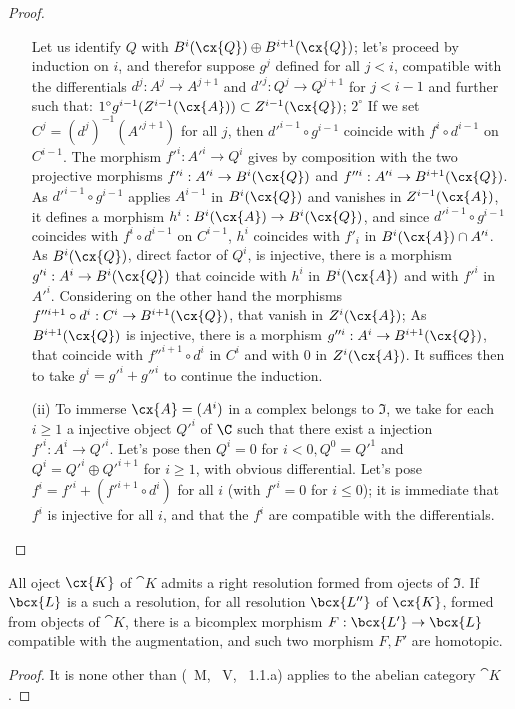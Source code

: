 \begin{proof}
\begin{enumerate}
  Let us identify $Q$ with $B^i(\cx{Q})\oplus B^{i+1}(\cx{Q})$; let's proceed by induction on $i$, and therefor suppose 
  $g^j$ defined for all $j<i$, compatible with the differentials $d^j: A^j\rightarrow A^{j+1}$ and $d'^j: Q^j\rightarrow Q^{j+1}$ for $j<i-1$
  and further such that: $1^\circ g^{i-1}(Z^{i-1}(\cx{A}))\subset Z^{i-1}(\cx{Q})$; 
  $2^\circ$ If we set $C^j = (d^j)^{-1}(A'^{j+1})$ for all $j$, then $d'^{i-1}\circ g^{i-1}$ coincide with $f^i\circ d^{i-1}$ on $C^{i-1}$.
  The morphism $f'^i: A'^i\rightarrow Q^i$ gives by composition with the two projective morphisms $f'^i: A'^i\rightarrow B^i(\cx{Q})$ and $f''^i: A'^i\rightarrow B^{i+1}(\cx{Q})$.
  As $d'^{i-1}\circ g^{i-1}$ applies $A^{i-1}$ in $B^i(\cx{Q})$ and vanishes in $Z^{i-1}(\cx{A})$, it defines a morphism $h^i:B^i(\cx{A})\rightarrow B^i(\cx{Q})$,
  and since $d'^{i-1}\circ g^{i-1}$ coincides with $f^i\circ d^{i-1}$ on $C^{i-1}$, $h^i$ coincides with $f'_i$ in $B^i(\cx{A})\cap A'^i$.
  As $B^i(\cx{Q})$, direct factor of $Q^i$, is injective, there is a morphism $g'^i: A^i\rightarrow B^i(\cx{Q})$ that coincide with $h^i$ in $B^i(\cx{A})$ and with $f'^i$ in $A'^i$.
  Considering on the other hand the morphisms $f''^{i+1}\circ d^i: C^i\rightarrow B^{i+1}(\cx{Q})$, that vanish in $Z^i(\cx{A})$;
  As $B^{i+1}(\cx{Q})$ is injective, there is a morphism $g''^i: A^i\rightarrow B^{i+1}(\cx{Q})$, that coincide with $f''^{i+1}\circ d^i$ in $C^i$ and with 0 in $Z^i(\cx{A})$.
  It suffices then to take $g^i = g'^i + g''^i$ to continue the induction.
  \item[(ii)] To immerse $\cx{A} = (A^i)$ in a complex belongs to $\mathfrak{I}$, we take for each $i\geq 1$ a injective object $Q'^i$ of $\C$ such that there exist a injection $f'^i:A^i\rightarrow Q'^i$.
  Let's pose then $Q^i=0$ for $i<0, Q^0 = Q'^1$ and $Q^i=Q'^i\oplus Q'^{i+1}$ for $i\geq 1$, with obvious differential.
  Let's pose $f^i = f'^i + (f'^{i+1} \circ d^i)$ for all $i$ (with $f'^i = 0$ for $i\leq 0$);
  it is immediate that $f^i$ is injective for all $i$, and that the $f^i$ are compatible with the differentials.
\end{enumerate}
\end{proof}
  
\begin{corollary}[11.5.2.2]
\label{0.11.5.2.2}
All oject $\cx{K}$ of $\cat{K}$ admits a right resolution formed from ojects of $\mathfrak{I}$.
If $\bcx{L}$ is a such a resolution, for all resolution $\bcx{L''}$ of $\cx{K}$, formed from objects of $\cat{K}$,
there is a bicomplex morphism $F: \bcx{L'}\rightarrow \bcx{L}$ compatible with the augmentation, and such two morphism $F, F'$ are homotopic.

\begin{proof}
It is none other than (~M, ~V, ~1.1.a) applies to the abelian category $\cat{K}$.
\end{proof}
\end{corollary}
  
